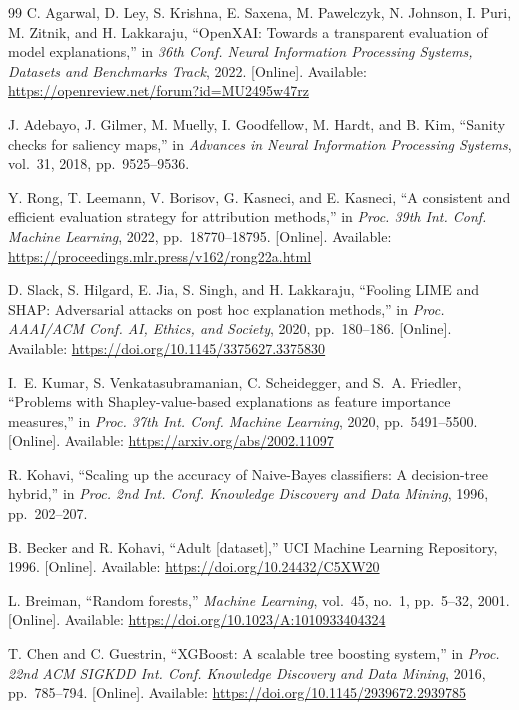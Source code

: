 \documentclass{cleiej}
\begin{document}
\begin{thebibliography}{99}
C. Agarwal, D. Ley, S. Krishna, E. Saxena, M. Pawelczyk, N. Johnson,
I. Puri, M. Zitnik, and H. Lakkaraju, ``OpenXAI: Towards a transparent
evaluation of model explanations,'' in \emph{36th Conf. Neural Information
Processing Systems, Datasets and Benchmarks Track}, 2022. [Online].
Available: \url{https://openreview.net/forum?id=MU2495w47rz}

J. Adebayo, J. Gilmer, M. Muelly, I. Goodfellow, M. Hardt, and B. Kim,
``Sanity checks for saliency maps,'' in \emph{Advances in Neural
Information Processing Systems}, vol.~31, 2018, pp.~9525--9536.

Y. Rong, T. Leemann, V. Borisov, G. Kasneci, and E. Kasneci, ``A consistent
and efficient evaluation strategy for attribution methods,'' in \emph{Proc.
39th Int. Conf. Machine Learning}, 2022, pp.~18770--18795. [Online]. Available:
\url{https://proceedings.mlr.press/v162/rong22a.html}

D. Slack, S. Hilgard, E. Jia, S. Singh, and H. Lakkaraju, ``Fooling LIME
and SHAP: Adversarial attacks on post hoc explanation methods,'' in
\emph{Proc. AAAI/ACM Conf. AI, Ethics, and Society}, 2020, pp.~180--186.
[Online]. Available: \url{https://doi.org/10.1145/3375627.3375830}

I.~E. Kumar, S. Venkatasubramanian, C. Scheidegger, and S.~A. Friedler,
``Problems with Shapley-value-based explanations as feature importance
measures,'' in \emph{Proc. 37th Int. Conf. Machine Learning}, 2020,
pp.~5491--5500. [Online]. Available: \url{https://arxiv.org/abs/2002.11097}

R. Kohavi, ``Scaling up the accuracy of Naive-Bayes classifiers: A
decision-tree hybrid,'' in \emph{Proc. 2nd Int. Conf. Knowledge Discovery
and Data Mining}, 1996, pp.~202--207.

B. Becker and R. Kohavi, ``Adult [dataset],'' UCI Machine Learning
Repository, 1996. [Online]. Available:
\url{https://doi.org/10.24432/C5XW20}

L. Breiman, ``Random forests,'' \emph{Machine Learning}, vol.~45, no.~1,
pp.~5--32, 2001. [Online]. Available:
\url{https://doi.org/10.1023/A:1010933404324}

T. Chen and C. Guestrin, ``XGBoost: A scalable tree boosting system,'' in
\emph{Proc. 22nd ACM SIGKDD Int. Conf. Knowledge Discovery and Data
Mining}, 2016, pp.~785--794. [Online]. Available:
\url{https://doi.org/10.1145/2939672.2939785}


\end{thebibliography}
\end{document}
